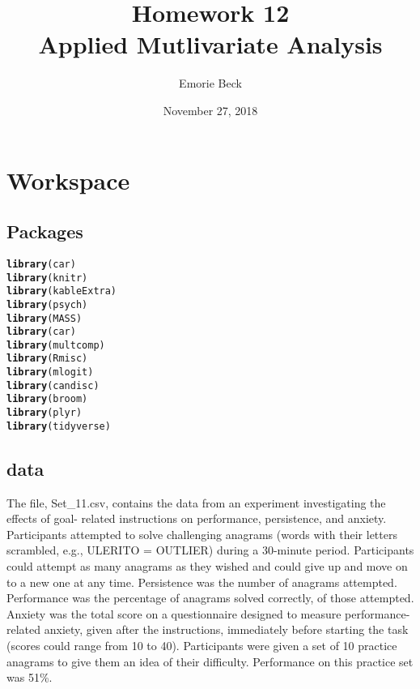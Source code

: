 \documentclass{article}\usepackage[]{graphicx}\usepackage[]{color}
\title{%
Homework 12\\
\large Applied Mutlivariate Analysis}
\date{November 27, 2018}
\author{Emorie Beck}
\makeatletter
\newcommand{\hlstd}[1]{\textcolor[rgb]{0.345,0.345,0.345}{#1}}%
\newcommand{\hlkwd}[1]{\textcolor[rgb]{0.737,0.353,0.396}{\textbf{#1}}}%
\newenvironment{kframe}{%
 \def\at@end@of@kframe{}%
 \ifinner\ifhmode%
  \def\at@end@of@kframe{\end{minipage}}%
  \begin{minipage}{\columnwidth}%
 \fi\fi%
 \def\FrameCommand##1{\hskip\@totalleftmargin \hskip-\fboxsep
 \colorbox{shadecolor}{##1}\hskip-\fboxsep
     \hskip-\linewidth \hskip-\@totalleftmargin \hskip\columnwidth}%
 \MakeFramed {\advance\hsize-\width
   \@totalleftmargin\z@ \linewidth\hsize
   \@setminipage}}%
 {\par\unskip\endMakeFramed%
 \at@end@of@kframe}
\newenvironment{knitrout}{}{} %
\makeatother
\begin{document}
\maketitle

\section{Workspace}
\subsection{Packages}



\begin{knitrout}
\color{fgcolor}\begin{kframe}
\begin{alltt}
\hlkwd{library}\hlstd{(car)}
\hlkwd{library}\hlstd{(knitr)}
\hlkwd{library}\hlstd{(kableExtra)}
\hlkwd{library}\hlstd{(psych)}
\hlkwd{library}\hlstd{(MASS)}
\hlkwd{library}\hlstd{(car)}
\hlkwd{library}\hlstd{(multcomp)}
\hlkwd{library}\hlstd{(Rmisc)}
\hlkwd{library}\hlstd{(mlogit)}
\hlkwd{library}\hlstd{(candisc)}
\hlkwd{library}\hlstd{(broom)}
\hlkwd{library}\hlstd{(plyr)}
\hlkwd{library}\hlstd{(tidyverse)}
\end{alltt}
\end{kframe}
\end{knitrout}



\subsection{data}
The file, Set\_11.csv, contains the data from an experiment investigating the effects of goal- related instructions on performance, persistence, and anxiety. Participants attempted to solve challenging anagrams (words with their letters scrambled, e.g., ULERITO = OUTLIER) during a 30-minute period. Participants could attempt as many anagrams as they wished and could give up and move on to a new one at any time. Persistence was the number of anagrams attempted. Performance was the percentage of anagrams solved correctly, of those attempted. Anxiety was the total score on a questionnaire designed to measure performance-related anxiety, given after the instructions, immediately before starting the task (scores could range from 10 to 40).
Participants were given a set of 10 practice anagrams to give them an idea of their difficulty. Performance on this practice set was 51\%.
\end{document}
